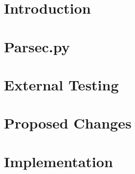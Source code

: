 \section{Introduction}

\section{Parsec.py}

\section{External Testing}


\section{Proposed Changes}


\section{Implementation}

% 






